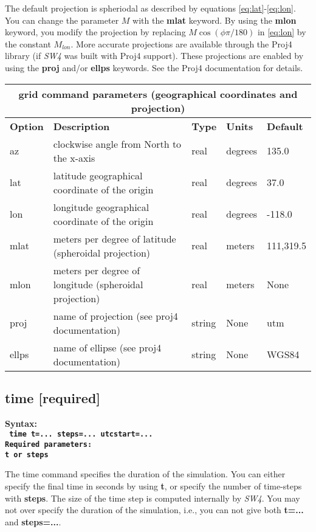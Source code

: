 \documentclass[11pt]{report}
\begin{document}
The default projection is spheriodal as described by equations \eqref{eq:lat}-\eqref{eq:lon}. You
can change the parameter $M$ with the {\bf mlat} keyword. By using the {\bf mlon} keyword, you
modify the projection by replacing $M\cos(\phi\pi/180)$ in \eqref{eq:lon} by the constant
$M_{lon}$. More accurate projections are available through the Proj4 library (if \emph{SW4} was
built with Proj4 support). These projections are enabled by using the {\bf proj} and/or {\bf ellps}
keywords. See the Proj4 documentation for details.
\begin{center}
\begin{tabular}{|l|p{8cm}|l|l|l|} \hline
\multicolumn{5}{|c|}{\bf grid command parameters (geographical coordinates and projection)}\\ \hline
\bf{Option} & \bf{Description} & \bf{Type} & \bf{Units} & \bf{Default}\\ \hline \hline
az & clockwise angle from North to the x-axis & real & degrees & 135.0 \\ \hline
lat & latitude geographical coordinate of the origin & real & degrees & 37.0 \\ \hline
lon & longitude geographical coordinate of the origin & real & degrees & -118.0 \\ \hline
mlat & meters per degree of latitude (spheroidal projection) & real & meters & 111,319.5 \\ \hline
mlon & meters per degree of longitude (spheroidal projection) & real & meters & None \\ \hline
proj & name of  projection (see proj4 documentation) & string & None & utm \\ \hline
ellps & name of ellipse (see proj4 documentation) & string & None & WGS84 \\ \hline
\end{tabular}
\end{center}

\subsection{time [required]}
\begin{flushleft}
\bf Syntax:\\
\tt
time t=... steps=... utcstart=...\\
\bf Required parameters:\\
\tt t \rm or \tt steps
\end{flushleft}
The time command specifies the duration of the simulation. You can either specify the final time in
seconds by using {\bf t}, or specify the number of time-steps with {\bf steps}.  The size of the
time step is computed internally by \emph{SW4}. You may not over specify the duration of the
simulation, i.e., you can not give both {\bf t=...} and {\bf steps=...}.
\end{document}

